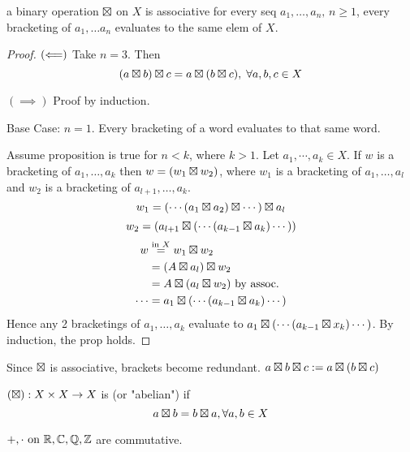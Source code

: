 \documentclass[12pt]{article}
\begin{document}
\bbox
\begin{prop}
  a binary operation \(\boxtimes\) on \(X\) is associative  for every
  seq \(a_1,\dots,a_n,\,n\ge 1\), every bracketing of \(a_1,\dots a_n\) 
  evaluates to the same elem of \(X\).
\end{prop}
\ebox

\bboxproof
\begin{proof}
  \((\Longleftarrow)\) Take \(n=3\). Then
  \[(a\boxtimes b)\boxtimes c=a\boxtimes(b\boxtimes c),\;\forall a,b,c\in X\]

  \((\implies)\) Proof by induction.

  Base Case: \(n=1\). Every bracketing of a word evaluates to that same word.
  
  Assume proposition is true for \(n<k\), where \(k>1\). Let \(a_1,\cdots,a_k
  \in X\). If \(w\) is a bracketing of \(a_1,\dots,a_k\) then
  \(w=(w_1\boxtimes w_2)\), where
  \(w_1\) is a bracketing of \(a_1,\dots,a_l\) and \(w_2\) is a bracketing of
  \(a_{l+1},\dots,a_k\).
  \[w_1=(\cdots(a_1\boxtimes a_2)\boxtimes\cdots)\boxtimes a_l\]
  \[w_2=(a_{l+1}\boxtimes(\cdots(a_{k-1}\boxtimes a_k)\cdots))\]
  \begin{equation*}
    \begin{split}
      w&\overset{\text{in }X}=w_1\boxtimes w_2\\
       &=(A\boxtimes a_l)\boxtimes w_2\\
       &=A\boxtimes(a_l\boxtimes w_2)\text{ by assoc.}\\
      \cdots&= a_1\boxtimes(\cdots(a_{k-1}\boxtimes a_k)\cdots)
    \end{split}
  \end{equation*}
  Hence any 2 bracketings of \(a_1,\dots,a_k\) evaluate to \(a_1\boxtimes
  (\cdots(a_{k-1}\boxtimes x_k)\cdots)\). By induction, the prop holds.
\end{proof}
\ebox


\bboxnote
\begin{nota}\label{nota:bad_bracks}
  Since \(\boxtimes\) is associative, brackets become
  redundant. \(a\boxtimes b\boxtimes c:=
  a\boxtimes(b\boxtimes c)\)
\end{nota}
\ebox


\bbox
\begin{defn}[Commutative] \label{defn:comm}
  \((\boxtimes):X\times X\to X\) is  (or "abelian") if
  \[a\boxtimes b=b\boxtimes a,\forall a,b\in X\]
\end{defn}
\ebox

\bboxex
\(+,\cdot\text{ on }\mathbb R,\mathbb C,\mathbb Q,\mathbb Z\) are commutative. 
\ebox
\end{document}
